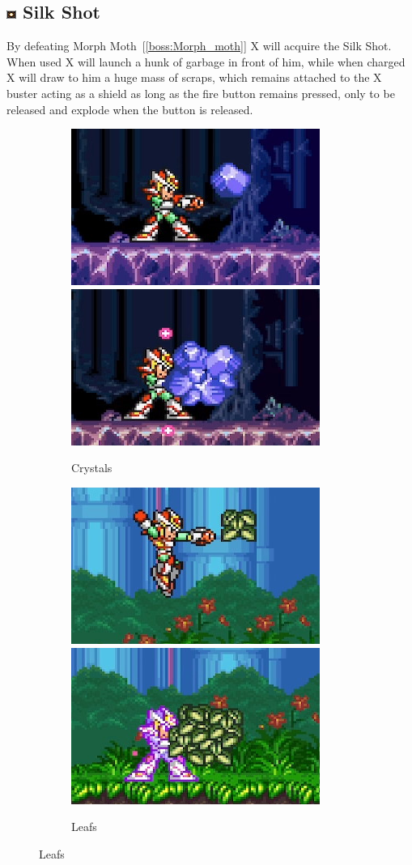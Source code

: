 \subsection{\includegraphics[width=12px, height=10px]{figures/X2/weapons/S_shot.png} Silk Shot}\label{Silk_shot}
By defeating Morph Moth~[\ref{boss:Morph_moth}] X will acquire the Silk Shot. When used X will launch a hunk of garbage in front of him, while when charged X will draw to him a huge mass of scraps, which remains attached to the X buster acting as a shield as long as the fire button remains pressed, only to be released and explode when the button is released.
\begin{figure}[htp]
	\begin{subfigure}{\linewidth}
		\centering
		\includegraphics[width=0.4\linewidth]{figures/X2/weapons/S_shot_1.png}	
		\includegraphics[width=0.4\linewidth]{figures/X2/weapons/S_shot_2.png}	
		\caption{Crystals}	
	\end{subfigure}
	\begin{subfigure}{\linewidth}
		\centering
		\includegraphics[width=0.4\linewidth]{figures/X2/weapons/S_shot_3.png}	
		\includegraphics[width=0.4\linewidth]{figures/X2/weapons/S_shot_4.png}	
		\caption{Leafs}
	\end{subfigure}
\end{figure}
